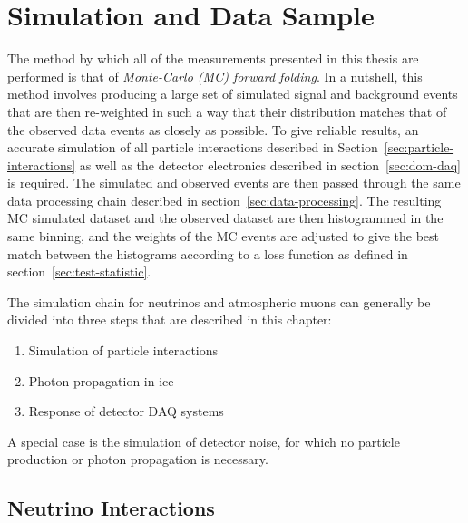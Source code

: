 \section{Simulation and Data Sample}

The method by which all of the measurements presented in this thesis are performed is that of \emph{Monte-Carlo (MC) forward folding}. In a nutshell, this method involves producing a large set of simulated signal and background events that are then re-weighted in such a way that their distribution matches that of the observed data events as closely as possible. To give reliable results, an accurate simulation of all particle interactions described in Section~\ref{sec:particle-interactions} as well as the detector electronics described in section~\ref{sec:dom-daq} is required. The simulated and observed events are then passed through the same data processing chain described in section~\ref{sec:data-processing}. The resulting MC simulated dataset and the observed dataset are then histogrammed in the same binning, and the weights of the MC events are adjusted to give the best match between the histograms according to a loss function as defined in section~\ref{sec:test-statistic}.

The simulation chain for neutrinos and atmospheric muons can generally be divided into three steps that are described in this chapter:
\begin{enumerate}
    \item Simulation of particle interactions
    \item Photon propagation in ice
    \item Response of detector DAQ systems
\end{enumerate}
A special case is the simulation of detector noise, for which no particle production or photon propagation is necessary.



\subsection{Neutrino Interactions}

